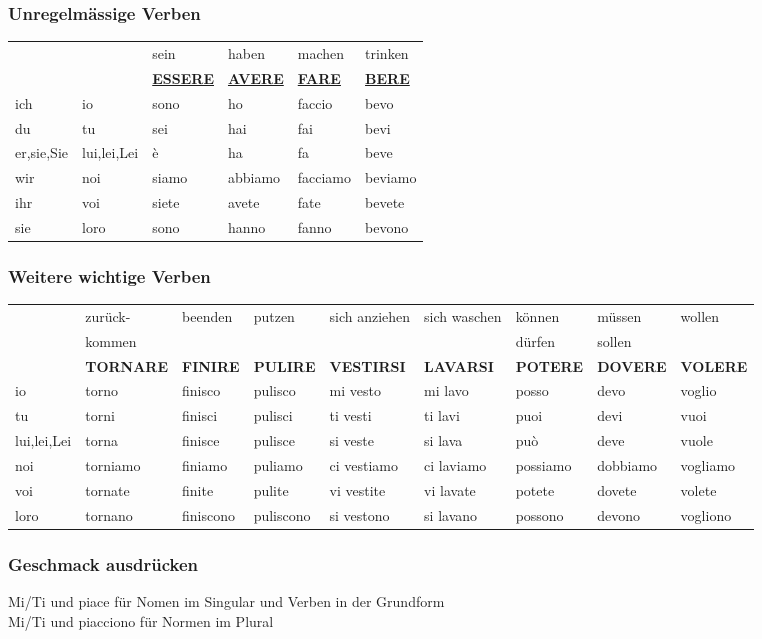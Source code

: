 \documentclass[10pt]{scrartcl}
\begin{document}
\subsubsection*{Unregelmässige Verben}
\begin{tabular}{llllll}
&&  sein & haben & machen & trinken\\
&&  \textbf{\underline{ESSERE}}  & \textbf{\underline{AVERE}} & \textbf{\underline{FARE}} & \textbf{\underline{BERE}}\\
ich & io & sono & ho & faccio & bevo\\
du & tu & sei & hai & fai & bevi\\
er,sie,Sie& lui,lei,Lei & è & ha & fa & beve\\
wir & noi & siamo & abbiamo & facciamo & beviamo \\
ihr & voi & siete & avete & fate & bevete\\
sie & loro & sono & hanno & fanno & bevono\\
\end{tabular}
\subsubsection*{Weitere wichtige Verben}
\begin{tabular}{lllllllll}
& zurück- & beenden & putzen & sich anziehen & sich waschen & können & müssen & wollen\\
& kommen  &  &  &  &  & dürfen & sollen \\
& \textbf{TORNARE} & \textbf{FINIRE} & \textbf{PULIRE} & \textbf{VESTIRSI} & \textbf{LAVARSI} & \textbf{POTERE} & \textbf{DOVERE} & \textbf{VOLERE}\\
io & torno & finisco & pulisco & mi vesto & mi lavo & posso & devo & voglio\\
tu & torni & finisci & pulisci & ti vesti & ti lavi & puoi & devi & vuoi\\
lui,lei,Lei & torna & finisce & pulisce & si veste & si lava & può & deve & vuole\\
noi & torniamo & finiamo & puliamo & ci vestiamo & ci laviamo & possiamo & dobbiamo & vogliamo\\
voi & tornate & finite & pulite & vi vestite & vi lavate & potete & dovete & volete\\
loro & tornano & finiscono & puliscono & si vestono & si lavano & possono & devono & vogliono\\

\end{tabular}
\subsubsection*{Geschmack ausdrücken}
Mi/Ti und piace für Nomen im Singular und Verben in der Grundform\\
Mi/Ti und piacciono für Normen im Plural\\
\end{document}
